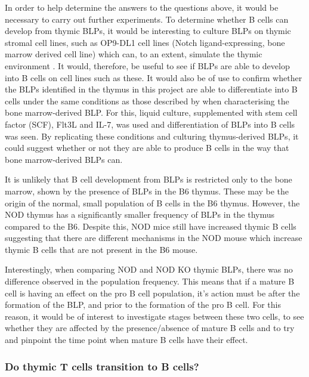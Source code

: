 In order to help determine the answers to the questions above, it would be necessary to carry out further experiments.
To determine whether B cells can develop from thymic BLPs, it would be interesting to culture BLPs on thymic stromal cell lines, such as OP9-DL1 cell lines (Notch ligand-expressing, bone marrow derived cell line) which can, to an extent, simulate the thymic environment \citep{Holmes2009}.
It would, therefore, be useful to see if BLPs are able to develop into B cells on cell lines such as these.
It would also be of use to confirm whether the BLPs identified in the thymus in this project are able to differentiate into B cells under the same conditions as those described by \citet{Inlay2009} when characterising the bone marrow-derived BLP.
For this, liquid culture, supplemented with stem cell factor (SCF), Flt3L and IL-7, was used and differentiation of BLPs into B cells was seen.
By replicating these conditions and culturing thymus-derived BLPs, it could suggest whether or not they are able to produce B cells in the way that bone marrow-derived BLPs can.

It is unlikely that B cell development from BLPs is restricted only to the bone marrow, shown by the presence of BLPs in the B6 thymus.
These may be the origin of the normal, small population of B cells in the B6 thymus.
However, the NOD thymus has a significantly smaller frequency of BLPs in the thymus compared to the B6.
Despite this, NOD mice still have increased thymic B cells suggesting that there are different mechanisms in the NOD mouse which increase thymic B cells that are not present in the B6 mouse.

Interestingly, when comparing NOD and NOD KO thymic BLPs, there was no difference observed in the population frequency.
This means that if a mature B cell is having an effect on the pro B cell population, it's action must be after the formation of the BLP, and prior to the formation of the pro B cell.
For this reason, it would be of interest to investigate stages between these two cells, to see whether they are affected by the presence/absence of mature B cells and to try and pinpoint the time point when mature B cells have their effect.

\subsubsection{Do thymic T cells transition to B cells?}

